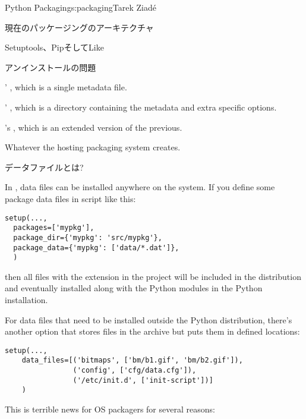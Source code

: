 \begin{aosachapter}{Python Packaging}{s:packaging}{Tarek Ziad\'{e}}
\begin{aosasect1}{現在のパッケージングのアーキテクチャ}
\begin{aosasect2}{Setuptools、PipそしてLike}
\begin{aosasect3}{アンインストールの問題}
\begin{aosaitemize}

  \item {}' , which is a single metadata
  file.

  \item {}' , which is a directory
  containing the metadata and extra  specific
  options.

  \item {}'s , which is an extended version of
  the previous.

  \item Whatever the hosting packaging system creates.

\end{aosaitemize}

\end{aosasect3}

\end{aosasect2}

\begin{aosasect2}{データファイルとは?}

In , data files can be installed anywhere on the
system.  If you define some package data files in 
script like this:

\begin{verbatim}
setup(...,
  packages=['mypkg'],
  package_dir={'mypkg': 'src/mypkg'},
  package_data={'mypkg': ['data/*.dat']},
  )
\end{verbatim}

\noindent then all files with the  extension in the 
project will be included in the distribution and eventually installed
along with the Python modules in the Python installation.

For data files that need to be installed outside the Python distribution, 
there's another option that stores files in the archive but puts them in defined
locations:

\begin{verbatim}
setup(...,
    data_files=[('bitmaps', ['bm/b1.gif', 'bm/b2.gif']),
                ('config', ['cfg/data.cfg']),
                ('/etc/init.d', ['init-script'])]
    )
\end{verbatim}

\noindent
This is terrible news for OS packagers for several reasons:


\end{aosasect2}
\end{aosasect1}
\end{aosachapter}
